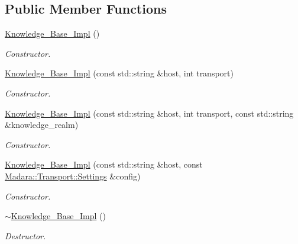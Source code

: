 \subsection*{Public Member Functions}
\begin{DoxyCompactItemize}
\item 
\hyperlink{classMadara_1_1Knowledge__Engine_1_1Knowledge__Base__Impl_ab69a2d209781731d59ac71b752d2378c}{Knowledge\_\-Base\_\-Impl} ()
\begin{DoxyCompactList}\small\item\em Constructor. \item\end{DoxyCompactList}\item 
\hyperlink{classMadara_1_1Knowledge__Engine_1_1Knowledge__Base__Impl_af1582b67af1495ba7e188ec3f6d6f3f3}{Knowledge\_\-Base\_\-Impl} (const std::string \&host, int transport)
\begin{DoxyCompactList}\small\item\em Constructor. \item\end{DoxyCompactList}\item 
\hyperlink{classMadara_1_1Knowledge__Engine_1_1Knowledge__Base__Impl_a0a289ef48b21ea9a474ad2258119952a}{Knowledge\_\-Base\_\-Impl} (const std::string \&host, int transport, const std::string \&knowledge\_\-realm)
\begin{DoxyCompactList}\small\item\em Constructor. \item\end{DoxyCompactList}\item 
\hyperlink{classMadara_1_1Knowledge__Engine_1_1Knowledge__Base__Impl_a0e42842347a6c03ccede563a8a0c3959}{Knowledge\_\-Base\_\-Impl} (const std::string \&host, const \hyperlink{classMadara_1_1Transport_1_1Settings}{Madara::Transport::Settings} \&config)
\begin{DoxyCompactList}\small\item\em Constructor. \item\end{DoxyCompactList}\item 
\hyperlink{classMadara_1_1Knowledge__Engine_1_1Knowledge__Base__Impl_adacde543f1ea55345ba2b40b3cd429fc}{$\sim$Knowledge\_\-Base\_\-Impl} ()
\begin{DoxyCompactList}\small\item\em Destructor. \item\end{DoxyCompactList}\item 

\end{DoxyCompactItemize}
